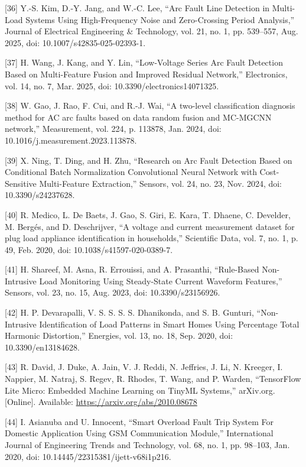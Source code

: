 \begin{thesisreferences}
{[}36{]} Y.-S. Kim, D.-Y. Jang, and W.-C. Lee, ``Arc Fault Line
Detection in Multi-Load Systems Using High-Frequency Noise and
Zero-Crossing Period Analysis,'' Journal of Electrical Engineering \&
Technology, vol. 21, no. 1, pp. 539--557, Aug. 2025, doi:
10.1007/s42835-025-02393-1.

{[}37{]} H. Wang, J. Kang, and Y. Lin, ``Low-Voltage Series Arc Fault
Detection Based on Multi-Feature Fusion and Improved Residual Network,''
Electronics, vol. 14, no. 7, Mar. 2025, doi:
10.3390/electronics14071325.

{[}38{]} W. Gao, J. Rao, F. Cui, and R.-J. Wai, ``A two-level
classification diagnosis method for AC arc faults based on data random
fusion and MC-MGCNN network,'' Measurement, vol. 224, p. 113878, Jan.
2024, doi: 10.1016/j.measurement.2023.113878.

{[}39{]} X. Ning, T. Ding, and H. Zhu, ``Research on Arc Fault Detection
Based on Conditional Batch Normalization Convolutional Neural Network
with Cost-Sensitive Multi-Feature Extraction,'' Sensors, vol. 24, no.
23, Nov. 2024, doi: 10.3390/s24237628.

{[}40{]} R. Medico, L. De Baets, J. Gao, S. Giri, E. Kara, T. Dhaene,
C. Develder, M. Bergés, and D. Deschrijver, ``A voltage and current
measurement dataset for plug load appliance identification in
households,'' Scientific Data, vol. 7, no. 1, p. 49, Feb. 2020, doi:
10.1038/s41597-020-0389-7.

{[}41{]} H. Shareef, M. Asna, R. Errouissi, and A. Prasanthi,
``Rule-Based Non-Intrusive Load Monitoring Using Steady-State Current
Waveform Features,'' Sensors, vol. 23, no. 15, Aug. 2023, doi:
10.3390/s23156926.

{[}42{]} H. P. Devarapalli, V. S. S. S. S. Dhanikonda, and S. B.
Gunturi, ``Non-Intrusive Identification of Load Patterns in Smart Homes
Using Percentage Total Harmonic Distortion,'' Energies, vol. 13, no. 18,
Sep. 2020, doi: 10.3390/en13184628.

{[}43{]} R. David, J. Duke, A. Jain, V. J. Reddi, N. Jeffries, J. Li,
N. Kreeger, I. Nappier, M. Natraj, S. Regev, R. Rhodes, T. Wang, and
P. Warden, ``TensorFlow Lite Micro: Embedded Machine Learning on TinyML
Systems,'' arXiv.org. {[}Online{]}. Available:
\url{https://arxiv.org/abs/2010.08678}

{[}44{]} I. Asianuba and U. Innocent, ``Smart Overload Fault Trip System
For Domestic Application Using GSM Communication Module,'' International
Journal of Engineering Trends and Technology, vol. 68, no. 1, pp.
98--103, Jan. 2020, doi: 10.14445/22315381/ijett-v68i1p216.


\end{thesisreferences}
